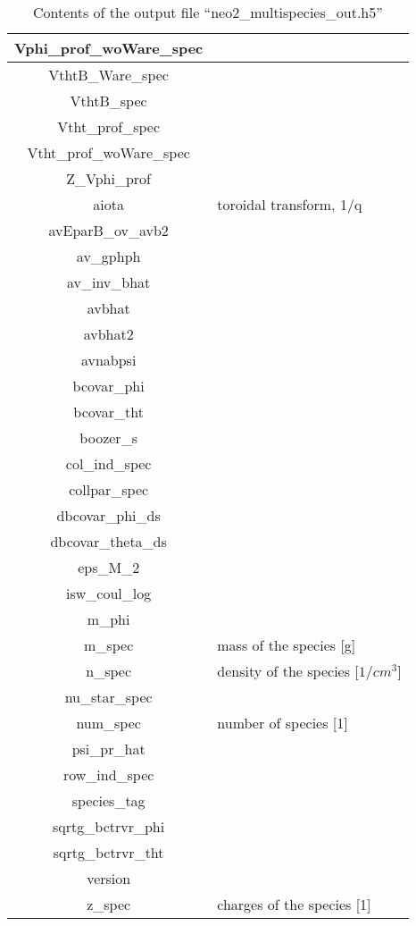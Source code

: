 \begin{table}[h]
\begin{tabular}{|c|l|}
\hline
Vphi\_prof\_woWare\_spec & \\
\hline
VthtB\_Ware\_spec & \\
\hline
VthtB\_spec & \\
\hline
Vtht\_prof\_spec & \\
\hline
Vtht\_prof\_woWare\_spec & \\
\hline
Z\_Vphi\_prof & \\
\hline
aiota & toroidal transform, 1/q \\
\hline
avEparB\_ov\_avb2 & \\
\hline
av\_gphph & \\
\hline
av\_inv\_bhat & \\
\hline
avbhat & \\
\hline
avbhat2 & \\
\hline
avnabpsi & \\
\hline
bcovar\_phi & \\
\hline
bcovar\_tht & \\
\hline
boozer\_s & \\
\hline
col\_ind\_spec & \\
\hline
collpar\_spec & \\
\hline
dbcovar\_phi\_ds & \\
\hline
dbcovar\_theta\_ds & \\
\hline
eps\_M\_2 & \\
\hline
isw\_coul\_log & \\
\hline
m\_phi & \\
\hline
m\_spec & mass of the species [g] \\
\hline
n\_spec & density of the species [$1/cm^3$] \\
\hline
nu\_star\_spec & \\
\hline
num\_spec & number of species [1] \\
\hline
psi\_pr\_hat & \\
\hline
row\_ind\_spec & \\
\hline
species\_tag & \\
\hline
sqrtg\_bctrvr\_phi & \\
\hline
sqrtg\_bctrvr\_tht & \\
\hline
version & \\
\hline
z\_spec & charges of the species [1]

\end{tabular}
\caption{Contents of the output file ``neo2\_multispecies\_out.h5''}
\end{table}


